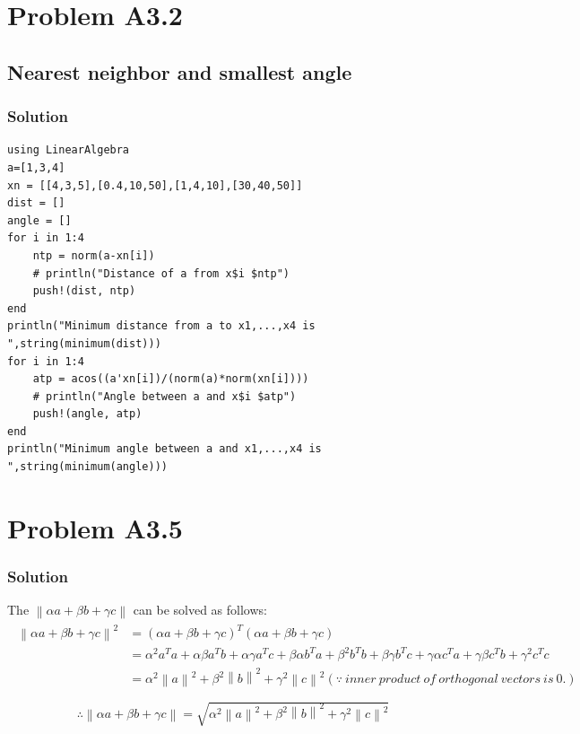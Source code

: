 \documentclass{article}
\newcommand{\norm}[1]{\left\lVert#1\right\rVert}
\begin{document}
\section*{Problem A3.2}
\subsection*{Nearest neighbor and smallest angle}
\subsubsection*{Solution}

  \begin{verbatim}
using LinearAlgebra
a=[1,3,4]
xn = [[4,3,5],[0.4,10,50],[1,4,10],[30,40,50]]
dist = []
angle = []
for i in 1:4
    ntp = norm(a-xn[i])
    # println("Distance of a from x$i $ntp")
    push!(dist, ntp)
end
println("Minimum distance from a to x1,...,x4 is ",string(minimum(dist)))
for i in 1:4
    atp = acos((a'xn[i])/(norm(a)*norm(xn[i])))
    # println("Angle between a and x$i $atp")
    push!(angle, atp)
end
println("Minimum angle between a and x1,...,x4 is ",string(minimum(angle)))
\end{verbatim}
\section*{Problem A3.5}
\subsubsection*{Solution}
The $\norm{\alpha a + \beta b + \gamma c}$ can be solved as follows:
\begin{align*}
\begin{split}
\norm{\alpha a + \beta b + \gamma c}^2 & = (\alpha a + \beta b + \gamma c)^T(\alpha a + \beta b + \gamma c)\\
& = \alpha^2 a^Ta + \alpha\beta a^Tb + \alpha\gamma a^Tc + \beta\alpha b^Ta + \beta^2 b^Tb + \beta\gamma b^Tc + \gamma\alpha c^Ta + \gamma\beta c^Tb + \gamma^2 c^Tc\\
& = \alpha^2 \norm{a}^2 + \beta^2 \norm{b}^2 + \gamma^2 \norm{c}^2
(\because\ inner\ product\ of\ orthogonal\ vectors\ is\ 0.)\\
\end{split}
\end{align*}
\begin{align*}
    \therefore \norm{\alpha a + \beta b + \gamma c} = \sqrt{\alpha^2 \norm{a}^2 + \beta^2 \norm{b}^2 + \gamma^2 \norm{c}^2}
\end{align*}
\end{document}
